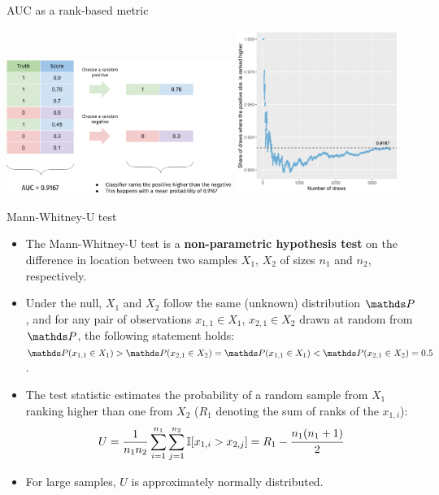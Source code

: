 \documentclass[11pt,compress,t,notes=noshow, xcolor=table]{beamer}
\begin{document}
\begin{vbframe}{AUC as a rank-based metric}
\begin{center}
  \includegraphics[width=0.55\textwidth]{figure_man/auc_interpretation_new}
  \includegraphics[width=0.4\textwidth] {figure/fig-eval_mwu_ranking}
\end{center}

\end{vbframe}


\begin{vbframe}{Mann-Whitney-U test}

\begin{itemize}
  \item The Mann-Whitney-U test is a \textbf{non-parametric hypothesis test} on 
  the difference in location between two samples $X_1$, $X_2$ of sizes $n_1$ and 
  $n_2$, respectively.
  \item Under the null, $X_1$ and $X_2$ follow the same (unknown) distribution 
  $\P$, and for any pair of observations $x_{1,1} \in X_1$, $x_{2,1} \in X_2$ 
  drawn at random from $\P$, the following statement holds:
  $\P(x_{1,1} \in X_1) > \P(x_{2,1} \in X_2) = \P(x_{1,1} \in X_1) < \P(x_{2,1} 
  \in X_2) = 0.5$.
  \item The test statistic estimates the probability of a random sample from 
  $X_1$ ranking higher than one from $X_2$ ($R_1$ denoting the sum of 
  ranks of the $x_{1,i}$):
  \begin{equation*}
      U = \frac{1}{n_1 n_2} \sum_{i = 1}^{n_1} \sum_{j = 1}^{n_2} 
      \mathbb{I}[x_{1,i} > x_{2,j}]
      = R_1 - \cfrac{n_1(n_1 + 1)}{2}
  \end{equation*}
  \item For large samples, $U$ is approximately normally distributed.
\end{itemize}

\end{vbframe}
\end{document}
